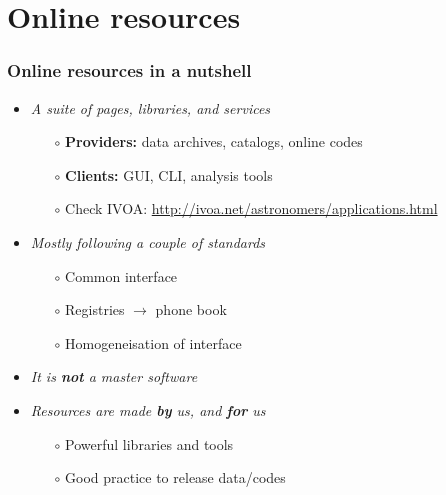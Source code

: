 \section{Online resources}

\begin{frame}
  \frametitle{Online resources in a nutshell}

  \begin{itemize}[<+->]
    \item \emph{A suite of pages, libraries, and services}
      \begin{itemize}[<.->]
        \item[$\circ$] \textbf{Providers:} data archives, catalogs, online codes
        \item[$\circ$] \textbf{Clients:} GUI, CLI, analysis tools
        \item[$\circ$] Check IVOA: \url{http://ivoa.net/astronomers/applications.html}
      \end{itemize}

    \vspace{1em}
    \item \emph{Mostly following a couple of standards}
      \begin{itemize}[<.->]
        \item[$\circ$] Common interface 
        \item[$\circ$] Registries $\rightarrow$ phone book
        \item[$\circ$] Homogeneisation of interface 
      \end{itemize}

    \vspace{1em}
    \item \emph{It is \textbf{not} a master software}

    \vspace{1em}
    \item \emph{Resources are made \textbf{by} us, and \textbf{for} us}
      \begin{itemize}[<.->]
        \item[$\circ$] Powerful libraries and tools
        \item[$\circ$] Good practice to release data/codes 
      \end{itemize}

  \end{itemize}

\end{frame}

